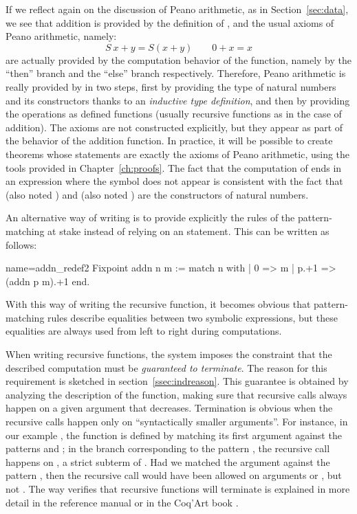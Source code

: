 If we reflect again on the discussion of Peano arithmetic, as in
Section~\ref{sec:data}, we see that addition is provided by the definition of
, and the usual axioms of Peano arithmetic, namely:
\[S~ x + y = S (x + y) \qquad 0 + x = x \]
are actually provided by the computation behavior of the function,
namely by the ``then'' branch and the ``else'' branch respectively.
Therefore, Peano arithmetic is really provided by \Coq{} in two steps,
first by providing the type of natural numbers and its constructors
thanks to an \emph{inductive type definition}, and then by providing
the operations as defined functions (usually recursive functions as in
the case of addition).  The axioms are not constructed explicitly,
but they appear as part of the behavior of the addition function.  In
practice, it will be possible to create theorems whose statements are
exactly the axioms of Peano arithmetic, using the tools provided in
Chapter~\ref{ch:proofs}.  The fact that the computation of  ends in an expression where the  symbol does not appear
is consistent with the fact that  (also noted ) and 
(also noted ) are the constructors of natural numbers.

An alternative way of writing  is to provide explicitly the
rules of the pattern-matching at stake instead of relying on an 
statement. This can be written as follows:

\begin{coq}{name=addn_redef2}{}
Fixpoint addn n m :=
  match n with
  | 0 => m
  | p.+1 => (addn p m).+1
  end.
\end{coq}
With this way of writing the recursive function, it becomes obvious that
pattern-matching rules describe equalities between two symbolic
expressions, but these equalities are always used from left to right during
computations.

When writing recursive functions, the \Coq{} system imposes the
constraint that the described computation must be \emph{guaranteed to
terminate}.  The reason for this requirement is sketched in
section~\ref{ssec:indreason}.
This guarantee is obtained by analyzing the description of the
function, making sure that recursive calls always happen on a
given argument that decreases.
Termination is obvious when the recursive calls happen
only on ``syntactically smaller arguments''. For instance, in our
example , the function is defined by matching its first
argument  against the patterns  and ; in the branch
corresponding to the pattern , the recursive call happens on
, a strict subterm of . Had we matched the argument 
against the pattern , then the recursive call would have been
allowed on arguments  or , but not .  The way
\Coq{} verifies that recursive functions will terminate is
explained in more detail in the reference manual \cite{Coq:manual} or in the
Coq'Art book \cite{BC04}.

